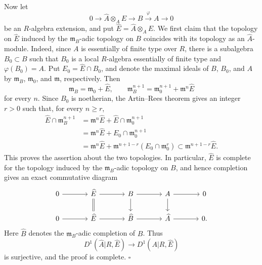 Now let
\[
 0\longrightarrow\widehat A\otimes_AE\longrightarrow B
 \xrightarrow{\ \varphi\ }A\longrightarrow0
\]
be an $R$-algebra extension, and put
$\widehat E=\widehat A\otimes_AE$. We first claim that the topology
on $\widehat E$ induced by the $\mathfrak m_B$-adic topology on $B$
coincides with its topology as an $\widehat A$-module. Indeed, since
$A$ is essentially of finite type over $R$, there is a subalgebra
$B_0\subset B$ such that $B_0$ is a local $R$-algebra essentially
of finite type and $\varphi(B_0)=A$. Put $E_0=\widehat E\cap B_0$,
and denote the maximal ideals of $B$, $B_0$, and $A$ by
$\mathfrak m_B$, $\mathfrak m_0$, and $\mathfrak m$, respectively.
Then
\[
 \mathfrak m_B=\mathfrak m_0+\widehat E,
 \qquad
 \mathfrak m_B^{n+1}=\mathfrak m_0^{n+1}
   +\mathfrak m^n\widehat E
\]
for every $n$. Since $B_0$ is noetherian, the Artin--Rees theorem
gives an integer $r>0$ such that, for every $n\geq r$,
\begin{align*}
 \widehat E\cap\mathfrak m_B^{n+1}
 &=\mathfrak m^n\widehat E
   +\widehat E\cap\mathfrak m_0^{n+1}\\
 &=\mathfrak m^n\widehat E
   +E_0\cap\mathfrak m_0^{n+1}\\
 &=\mathfrak m^n\widehat E
   +\mathfrak m^{n+1-r}(E_0\cap\mathfrak m_0^r)
 \subset\mathfrak m^{n+1-r}\widehat E.
\end{align*}
This proves the assertion about the two topologies. In particular,
$\widehat E$ is complete for the topology induced by the
$\mathfrak m_B$-adic topology on $B$, and hence completion gives an
exact commutative diagram
\[
\begin{tikzcd}[column sep=large]
0 \arrow[r] & \widehat E \arrow[r] \arrow[d,equal]
& B \arrow[r] \arrow[d]
& A \arrow[r] \arrow[d] & 0 \\
0 \arrow[r] & \widehat E \arrow[r]
& \widehat B \arrow[r]
& \widehat A \arrow[r] & 0.
\end{tikzcd}
\]
Here $\widehat B$ denotes the $\mathfrak m_B$-adic completion of
$B$. Thus
\[
 D^1(\widehat A|R,\widehat E)
 \longrightarrow D^1(A|R,\widehat E)
\]
is surjective, and the proof is complete.
\hfill$\square$
